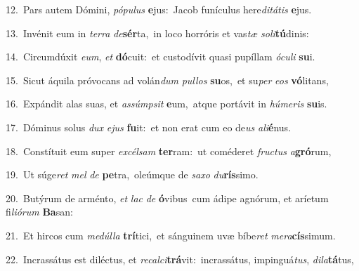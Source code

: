 {\numbfont\textcolor{\numbcolor}{12.}}~Pars autem Dómini, \textit{pó}\-\textit{pu}\textit{lus} \textbf{e}\-jus:~\star Jacob funículus here\-\textit{di}\-\textit{tá}\textit{tis} \textbf{e}\-jus.\par
{\numbfont\textcolor{\numbcolor}{13.}}~Invénit eum in \textit{ter}\-\textit{ra} \textit{de}\-\textbf{sér}ta,~\star in loco horróris et vas\textit{tæ} \textit{so}\-\textit{li}\textbf{tú}dinis:\par
{\numbfont\textcolor{\numbcolor}{14.}}~Circumdúxit \textit{e}\-\textit{um}, \textit{et} \textbf{dó}\-cuit:~\star et custodívit quasi pupíllam \textit{ó}\-\textit{cu}\textit{li} \textbf{su}\-i.\par
{\numbfont\textcolor{\numbcolor}{15.}}~Sicut áquila próvocans ad volán\textit{dum} \textit{pul}\-\textit{los} \textbf{su}\-os,~\star et su\textit{per} \textit{e}\-\textit{os} \textbf{vó}\-litans,\par
{\numbfont\textcolor{\numbcolor}{16.}}~Expándit alas suas, et \textit{as}\-\textit{súmp}\textit{sit} \textbf{e}\-um,~\star atque portávit in \textit{hú}\-\textit{me}\textit{ris} \textbf{su}\-is.\par
{\numbfont\textcolor{\numbcolor}{17.}}~Dóminus solus \textit{dux} \textit{e}\-\textit{jus} \textbf{fu}\-it:~\star et non erat cum eo de\textit{us} \textit{a}\-\textit{li}\textbf{é}nus.\par
{\numbfont\textcolor{\numbcolor}{18.}}~Constítuit eum super \textit{ex}\-\textit{cél}\textit{sam} \textbf{ter}\-ram:~\star ut coméderet \textit{fruc}\-\textit{tus} \textit{a}\-\textbf{gró}rum,\par
{\numbfont\textcolor{\numbcolor}{19.}}~Ut súge\textit{ret} \textit{mel} \textit{de} \textbf{pe}\-tra,~\star oleúmque de \textit{sa}\-\textit{xo} \textit{du}\-\textbf{rís}simo.\par
{\numbfont\textcolor{\numbcolor}{20.}}~Butýrum de arménto, \textit{et} \textit{lac} \textit{de} \textbf{ó}\-vibus~\star cum ádipe agnórum, et aríetum fi\-\textit{li}\-\textit{ó}\textit{rum} \textbf{Ba}\-san:\par
{\numbfont\textcolor{\numbcolor}{21.}}~Et hircos cum \textit{me}\-\textit{dúl}\textit{la} \textbf{trí}\-tici,~\star et sánguinem uvæ bíbe\textit{ret} \textit{me}\-\textit{ra}\textbf{cís}simum.\par
{\numbfont\textcolor{\numbcolor}{22.}}~Incrassátus est diléctus, et \textit{re}\-\textit{cal}\textit{ci}\textbf{trá}vit:~\star incrassátus, impinguá\-\textit{tus}\-, \textit{di}\-\textit{la}\textbf{tá}tus,\par
